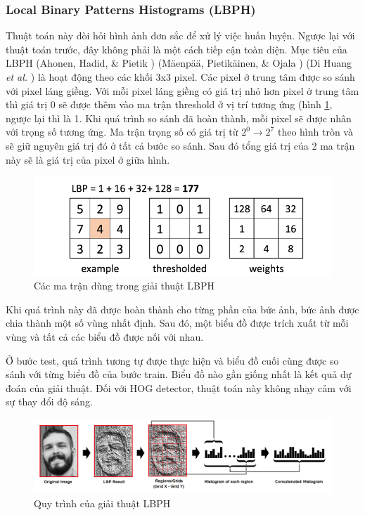 \documentclass[a4paper]{report}
\begin{document}
\subsubsection{Local Binary Patterns Histograms (LBPH)}
Thuật toán này đòi hỏi hình ảnh đơn sắc để xử lý việc huấn luyện. Ngược lại với thuật toán trước, đây không phải là một cách tiếp cận toàn diện. Mục tiêu của LBPH (Ahonen, Hadid, \& Pietik \cite{local1}) (Mäenpää, Pietikäinen, \& Ojala \cite{local2}) (Di Huang \textit{et al.} \cite{local3}) là hoạt động theo các khối 3x3 pixel. Các pixel ở trung tâm được so sánh với pixel láng giềng. Với mỗi pixel láng giềng có giá trị nhỏ hơn pixel ở trung tâm thì giá trị 0 sẽ được thêm vào ma trận threshold ở vị trí tương ứng (hình \ref{fig:lbph1}, ngược lại thì là 1. Khi quá trình so sánh đã hoàn thành, mỗi pixel sẽ được nhân với trọng số tương ứng. Ma trận trọng số có giá trị từ $2^0 \rightarrow 2^7$ theo hình tròn và sẽ giữ nguyên giá trị đó ở tất cả bước so sánh. Sau đó tổng giá trị của 2 ma trận này sẽ là giá trị của pixel ở giữa hình. 
\begin{figure}[H]
\centering
\includegraphics[scale=.5]{../images/fig/lbph1.png}
\caption{Các ma trận dùng trong giải thuật LBPH}
\label{fig:lbph1}
\end{figure}
Khi quá trình này đã được hoàn thành cho từng phần của bức ảnh, bức ảnh được chia thành một số vùng nhất định. Sau đó, một biểu đồ được trích xuất từ mỗi vùng và tất cả các biểu đồ được nối với nhau.
\par\noindent 
Ở bước test, quá trình tương tự được thực hiện và biểu đồ cuối cùng được so sánh với từng biểu đồ của bước train. Biểu đồ nào gần giống nhất là kết quả dự đoán của giải thuật. Đối với HOG detector, thuật toán này không nhạy cảm với sự thay đổi độ sáng.

%
\begin{figure}[H]
\centering
\includegraphics[width=.75\textwidth]{../images/fig/lbph2.png}
\caption{Quy trình của giải thuật LBPH}
\label{fig:lbph2}
\end{figure}
%
\end{document}
